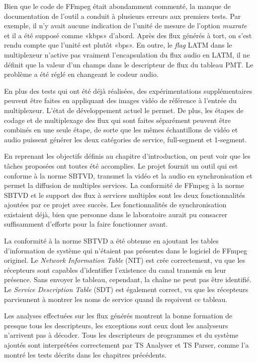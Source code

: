 \documentclass[12pt,a4paper]{article}
\begin{document}
Bien que le code de FFmpeg était abondamment commenté, la manque de documentation de l'outil a conduit à plusieurs erreurs aux premiers tests. Par exemple, il n'y avait aucune indication de l'unité de mesure de l'option \textit{muxrate} et il a été supposé comme «kbps» d'abord. Après des flux générés à tort, on s'est rendu compte que l'unité est plutôt «bps». En outre, le \textit{flag} LATM dans le multiplexeur n'active pas vraiment l'encapsulation du flux audio en LATM, il ne définit que la valeur d'un champs dans le descripteur de flux du tableau PMT. Le problème a été réglé en changeant le codeur audio.

En plus des tests qui ont été déjà réalisées, des expérimentations supplémentaires peuvent être faites en appliquant des images vidéo de référence à l'entrée du multiplexeur. L'état de développement actuel le permet. De plus, les étapes de codage et de multiplexage des flux qui sont faites séparément peuvent être combinés en une seule étape, de sorte que les mêmes échantillons de vidéo et audio puissent générer les deux catégories de service, full-segment et 1-segment.

En reprenant les objectifs définis au chapitre d'introduction, on peut voir que les tâches proposées ont toutes été accomplies. Le projet fournit un outil qui est conforme à la norme SBTVD, transmet la vidéo et la audio en synchronisation et permet la diffusion de multiples services. La conformité de FFmpeg à la norme SBTVD et le support des flux à services multiples sont les deux fonctionnalités ajoutées par ce projet avec succès. Les fonctionnalités de synchronisation existaient déjà, bien que personne dans le laboratoire aurait pu consacrer suffisamment d'efforts pour la faire fonctionner avant.

La conformité à la norme SBTVD a été obtenue en ajoutant les tables d'information de système qui n'étaient pas présentes dans le logiciel de FFmpeg originel. Le \textit{Network Information Table} (NIT) est crée correctement, vu que les récepteurs sont capables d'identifier l'existence du canal transmis en leur présence. Sans envoyer le tableau, cependant, la chaîne ne peut pas être identifié. Le \textit{Service Description Table} (SDT) est également correct, vu que les récepteurs parviennent à montrer les noms de service quand ils reçoivent ce tableau.

Les analyses effectuées sur les flux générés montrent la bonne formation de presque tous les descripteurs, les exceptions sont ceux dont les analyseurs n'arrivent pas à décoder. Tous les descripteurs de programmes et du système ajoutés sont interprétées correctement par TS Analyser et TS Parser, comme l'a montré les tests décrits dans les chapitres précédents.
\end{document}
